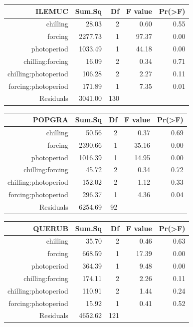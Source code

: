 \documentclass{article}\usepackage[]{graphicx}\usepackage[]{color}
\begin{document}
\begin{table}[ht]
\centering
\begin{tabular}{rrrrr}
  \hline
  ILEMUC & Sum.Sq & Df & F value & Pr(>F) \\
 \hline
chilling & 28.03 &   2 & 0.60 & 0.55 \\ 
  forcing & 2277.73 &   1 & 97.37 & 0.00 \\ 
  photoperiod & 1033.49 &   1 & 44.18 & 0.00 \\ 
  chilling:forcing & 16.09 &   2 & 0.34 & 0.71 \\ 
  chilling:photoperiod & 106.28 &   2 & 2.27 & 0.11 \\ 
  forcing:photoperiod & 171.89 &   1 & 7.35 & 0.01 \\ 
  Residuals & 3041.00 & 130 &  &  \\ 
   \hline
\end{tabular}
\end{table}
\begin{table}[ht]
\centering
\begin{tabular}{rrrrr}
  \hline
  POPGRA & Sum.Sq & Df & F value & Pr(>F) \\
 \hline
chilling & 50.56 &   2 & 0.37 & 0.69 \\ 
  forcing & 2390.66 &   1 & 35.16 & 0.00 \\ 
  photoperiod & 1016.39 &   1 & 14.95 & 0.00 \\ 
  chilling:forcing & 45.72 &   2 & 0.34 & 0.72 \\ 
  chilling:photoperiod & 152.02 &   2 & 1.12 & 0.33 \\ 
  forcing:photoperiod & 296.37 &   1 & 4.36 & 0.04 \\ 
  Residuals & 6254.69 &  92 &  &  \\ 
   \hline
\end{tabular}
\end{table}
\begin{table}[ht]
\centering
\begin{tabular}{rrrrr}
  \hline
  QUERUB & Sum.Sq & Df & F value & Pr(>F) \\
 \hline
chilling & 35.70 &   2 & 0.46 & 0.63 \\ 
  forcing & 668.59 &   1 & 17.39 & 0.00 \\ 
  photoperiod & 364.39 &   1 & 9.48 & 0.00 \\ 
  chilling:forcing & 174.11 &   2 & 2.26 & 0.11 \\ 
  chilling:photoperiod & 110.91 &   2 & 1.44 & 0.24 \\ 
  forcing:photoperiod & 15.92 &   1 & 0.41 & 0.52 \\ 
  Residuals & 4652.62 & 121 &  &  \\ 
   \hline
\end{tabular}
\end{table}
\end{document}
